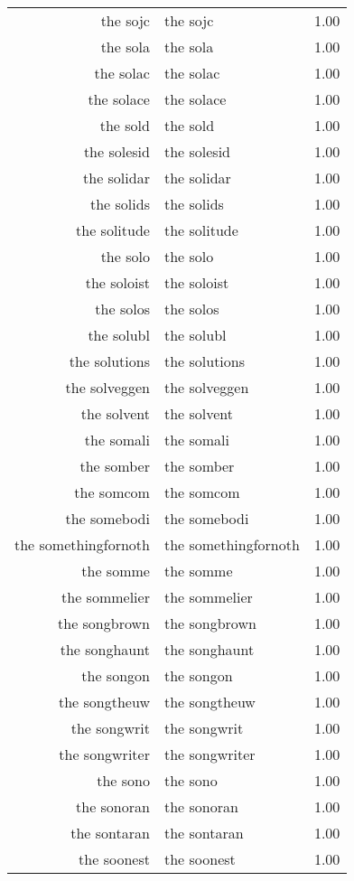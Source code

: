 \begin{table}[ht]
\begin{tabular}{rlr}
  the sojc & the sojc & 1.00 \\ 
  the sola & the sola & 1.00 \\ 
  the solac & the solac & 1.00 \\ 
  the solace & the solace & 1.00 \\ 
  the sold & the sold & 1.00 \\ 
  the solesid & the solesid & 1.00 \\ 
  the solidar & the solidar & 1.00 \\ 
  the solids & the solids & 1.00 \\ 
  the solitude & the solitude & 1.00 \\ 
  the solo & the solo & 1.00 \\ 
  the soloist & the soloist & 1.00 \\ 
  the solos & the solos & 1.00 \\ 
  the solubl & the solubl & 1.00 \\ 
  the solutions & the solutions & 1.00 \\ 
  the solveggen & the solveggen & 1.00 \\ 
  the solvent & the solvent & 1.00 \\ 
  the somali & the somali & 1.00 \\ 
  the somber & the somber & 1.00 \\ 
  the somcom & the somcom & 1.00 \\ 
  the somebodi & the somebodi & 1.00 \\ 
  the somethingfornoth & the somethingfornoth & 1.00 \\ 
  the somme & the somme & 1.00 \\ 
  the sommelier & the sommelier & 1.00 \\ 
  the songbrown & the songbrown & 1.00 \\ 
  the songhaunt & the songhaunt & 1.00 \\ 
  the songon & the songon & 1.00 \\ 
  the songtheuw & the songtheuw & 1.00 \\ 
  the songwrit & the songwrit & 1.00 \\ 
  the songwriter & the songwriter & 1.00 \\ 
  the sono & the sono & 1.00 \\ 
  the sonoran & the sonoran & 1.00 \\ 
  the sontaran & the sontaran & 1.00 \\ 
  the soonest & the soonest & 1.00 \\ 

\end{tabular}
\end{table}
